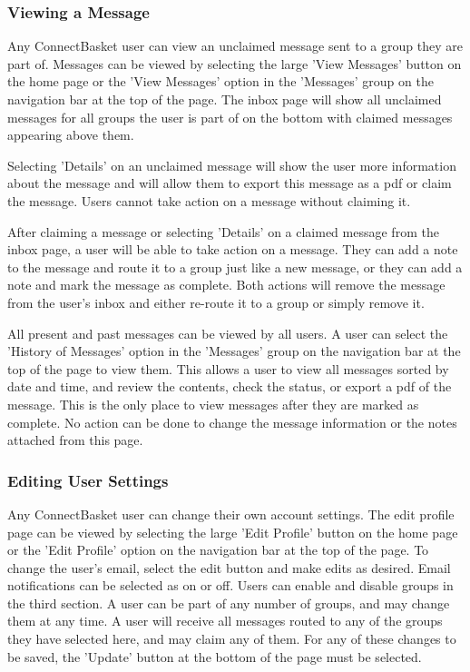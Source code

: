 \documentclass[onecolumn, draftclsnofoot,10pt, compsoc]{IEEEtran}
\begin{document}
\subsubsection{Viewing a Message}
Any ConnectBasket user can view an unclaimed message sent to a group they are part of. Messages can be viewed by selecting the large 'View Messages' button on the home page or the 'View Messages' option in the 'Messages' group on the navigation bar at the top of the page. The inbox page will show all unclaimed messages for all groups the user is part of on the bottom with claimed messages appearing above them.

Selecting 'Details' on an unclaimed message will show the user more information about the message and will allow them to export this message as a pdf or claim the message. Users cannot take action on a message without claiming it. 
	
After claiming a message or selecting 'Details' on a claimed message from the inbox page, a user will be able to take action on a message. They can add a note to the message and route it to a group just like a new message, or they can add a note and mark the message as complete. Both actions will remove the message from the user's inbox and either re-route it to a group or simply remove it.

All present and past messages can be viewed by all users. A user can select the 'History of Messages' option in the 'Messages' group on the navigation bar at the top of the page to view them. This allows a user to view all messages sorted by date and time, and review the contents, check the status, or export a pdf of the message. This is the only place to view messages after they are marked as complete. No action can be done to change the message information or the notes attached from this page.



\subsubsection{Editing User Settings}
Any ConnectBasket user can change their own account settings. The edit profile page can be viewed by selecting the large 'Edit Profile' button on the home page or the 'Edit Profile' option on the navigation bar at the top of the page. To change the user's email, select the edit button and make edits as desired. Email notifications can be selected as on or off. Users can enable and disable groups in the third section. A user can be part of any number of groups, and may change them at any time. A user will receive all messages routed to any of the groups they have selected here, and may claim any of them. For any of these changes to be saved, the 'Update' button at the bottom of the page must be selected.
\end{document}
